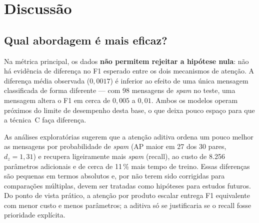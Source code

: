 \documentclass[conference]{IEEEtran}
\begin{document}
\section{Discussão}
\label{sec:discussao}

\subsection{Qual abordagem é mais eficaz?}
Na métrica principal, os dados \textbf{não permitem rejeitar a hipótese nula}: não há evidência de diferença no F1 esperado entre os dois mecanismos de atenção. A diferença média observada ($0,0017$) é inferior ao efeito de uma única mensagem classificada de forma diferente --- com 98 mensagens de \textit{spam} no teste, uma mensagem altera o F1 em cerca de $0,005$ a $0,01$. Ambos os modelos operam próximos do limite de desempenho desta base, o que deixa pouco espaço para que a técnica~C faça diferença.

As análises exploratórias sugerem que a atenção aditiva ordena um pouco melhor as mensagens por probabilidade de \textit{spam} (AP maior em 27 dos 30 pares, $d_z = 1,31$) e recupera ligeiramente mais \textit{spam} (recall), ao custo de 8.256 parâmetros adicionais e de cerca de 11\,\% mais tempo de treino. Essas diferenças são pequenas em termos absolutos e, por não terem sido corrigidas para comparações múltiplas, devem ser tratadas como hipóteses para estudos futuros. Do ponto de vista prático, a atenção por produto escalar entrega F1 equivalente com menor custo e menos parâmetros; a aditiva só se justificaria se o recall fosse prioridade explícita.
\end{document}
